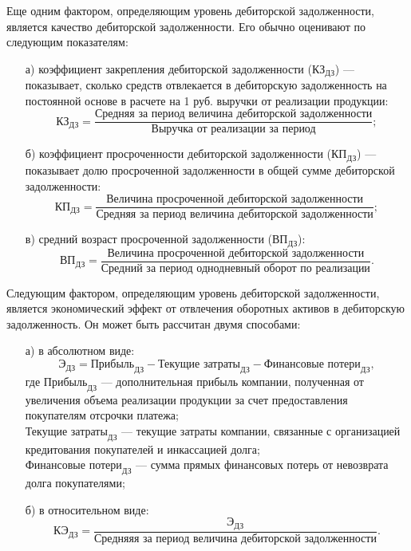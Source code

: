  Еще одним фактором, определяющим уровень дебиторской задолженности, является качество дебиторской задолженности.
 Его обычно оценивают по следующим показателям:
 \begin{enumerate}
 	\item [а)]коэффициент закрепления дебиторской задолженности ($ \text{КЗ}_\text{{ДЗ}} $) --- показывает, сколько средств отвлекается в дебиторскую задолженность на постоянной основе в расчете на 1 руб. выручки от реализации продукции:
 	\[ \text{КЗ}_\text{{ДЗ}} =  \dfrac{\text{Средняя за период величина дебиторской задолженности}}{\text{Выручка от реализации за период}};\]
 	\item [б)] коэффициент просроченности дебиторской задолженности ($ \text{КП}_\text{{ДЗ}} $) --- показывает долю просроченной задолженности в общей сумме дебиторской задолженности:
	 \[ \text{КП}_\text{{ДЗ}} =  \dfrac{\text{Величина просроченной дебиторской задолженности}}{\text{Средняя за период величина дебиторской задолженности}};\]
	 \item [в)] средний возраст просроченной задолженности ($ \text{ВП}_\text{{ДЗ}} $):
	 \[ \text{ВП}_\text{{ДЗ}} =  \dfrac{\text{Величина просроченной дебиторской задолженности}}{\text{Средний за период однодневный оборот по реализации}}.\]
 \end{enumerate}
 
 Следующим фактором, определяющим уровень дебиторской задолженности, является экономический эффект от отвлечения оборотных активов в дебиторскую задолженность.
 Он может быть рассчитан двумя способами:
 \begin{enumerate}
 	\item [а)] в абсолютном виде:
 	\[ \text{Э}_\text{ДЗ} = \text{Прибыль}_\text{ДЗ} - \text{Текущие затраты}_\text{ДЗ} - \text{Финансовые потери}_\text{ДЗ},\]
 	где $\text{Прибыль}_\text{ДЗ}$ --- дополнительная прибыль компании, полученная от увеличения объема реализации продукции за счет предоставления покупателям отсрочки платежа;\\
 	$\text{Текущие затраты}_\text{ДЗ}$ --- текущие затраты компании, связанные с организацией кредитования покупателей и инкассацией долга;\\
 	$\text{Финансовые потери}_\text{ДЗ}$ --- сумма прямых финансовых потерь от невозврата долга покупателями;
 	\item [б)] в относительном виде:
 	\[  \text{КЭ}_\text{ДЗ} = \dfrac{\text{Э}_\text{ДЗ}}{\text{Средняяя за период величина дебиторской задолженности}}.\]
 \end{enumerate}
 
